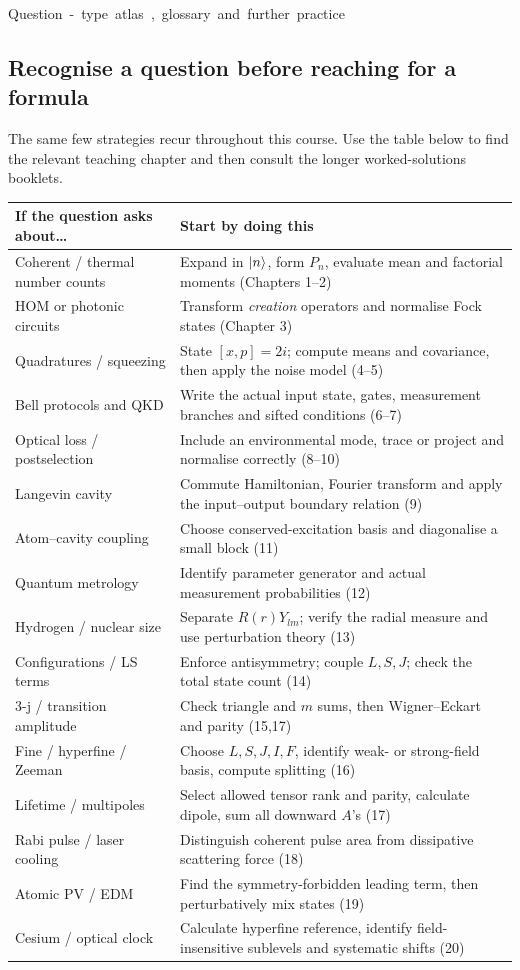 \unit{Question-type atlas, glossary and further practice}
\subsection{Recognise a question before reaching for a formula}
The same few strategies recur throughout this course.
Use the table below to find the relevant teaching chapter
and then consult the longer worked-solutions booklets.
\par\medskip\noindent
\begin{tabularx}{\linewidth}{@{}p{40mm}X@{}}
\toprule
\textbf{If the question asks about\ldots}&
\textbf{Start by doing this}\\\midrule
Coherent / thermal number counts&
Expand in \(\left\lvert n\right\rangle\), form \(P_n\), evaluate
mean and factorial moments (Chapters 1--2)\\
HOM or photonic circuits&
Transform \emph{creation} operators and
normalise Fock states (Chapter 3)\\
Quadratures / squeezing&
State \([x,p]=2i\); compute means and
covariance, then apply the noise model (4--5)\\
Bell protocols and QKD&
Write the actual input state, gates,
measurement branches and sifted conditions (6--7)\\
Optical loss / postselection&
Include an environmental mode, trace or
project and normalise correctly (8--10)\\
Langevin cavity&
Commute Hamiltonian, Fourier transform and
apply the input--output boundary relation (9)\\
Atom--cavity coupling&
Choose conserved-excitation basis and
diagonalise a small block (11)\\
Quantum metrology&
Identify parameter generator and actual
measurement probabilities (12)\\
Hydrogen / nuclear size&
Separate \(R(r)Y_{lm}\); verify the radial
measure and use perturbation theory (13)\\
Configurations / LS terms&
Enforce antisymmetry; couple \(L,S,J\);
check the total state count (14)\\
3-j / transition amplitude&
Check triangle and \(m\) sums, then
Wigner--Eckart and parity (15,17)\\
Fine / hyperfine / Zeeman&
Choose \(L,S,J,I,F\), identify weak- or
strong-field basis, compute splitting (16)\\
Lifetime / multipoles&
Select allowed tensor rank and parity,
calculate dipole, sum all downward \(A\)'s (17)\\
Rabi pulse / laser cooling&
Distinguish coherent pulse area from
dissipative scattering force (18)\\
Atomic PV / EDM&
Find the symmetry-forbidden leading term,
then perturbatively mix states (19)\\
Cesium / optical clock&
Calculate hyperfine reference,
identify field-insensitive sublevels
and systematic shifts (20)\\
\bottomrule
\end{tabularx}
\par\medskip
